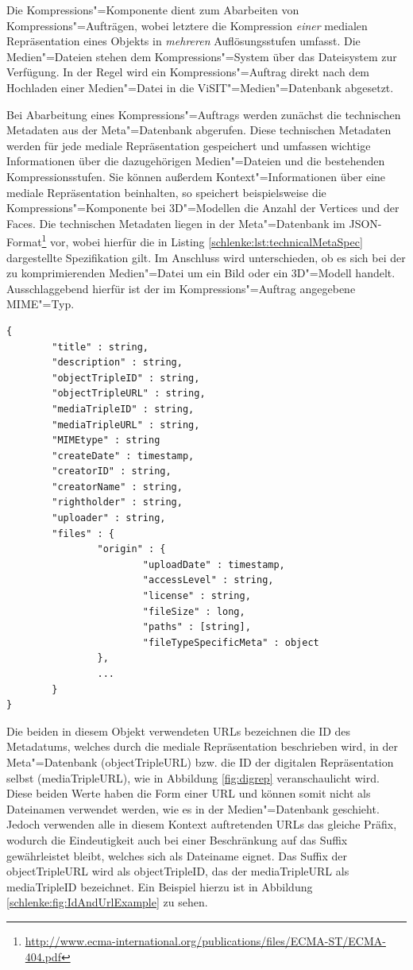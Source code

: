 Die Kompressions"=Komponente dient zum Abarbeiten von Kompressions"=Aufträgen, wobei letztere die Kompression \emph{einer} medialen Repräsentation eines Objekts in \emph{mehreren} Auflösungsstufen umfasst. Die Medien"=Dateien stehen dem Kompressions"=System über das Dateisystem zur Verfügung. In der Regel wird ein Kompressions"=Auftrag direkt nach dem Hochladen einer Medien"=Datei in die ViSIT"=Medien"=Datenbank abgesetzt.

Bei Abarbeitung eines Kompressions"=Auftrags werden zunächst die technischen Metadaten aus der Meta"=Datenbank abgerufen. Diese technischen Metadaten werden für jede mediale Repräsentation gespeichert und umfassen wichtige Informationen über die dazugehörigen Medien"=Dateien und die bestehenden Kompressionsstufen. Sie können außerdem Kontext"=Informationen über eine mediale Repräsentation beinhalten, so speichert beispielsweise die Kompressions"=Komponente bei 3D"=Modellen die Anzahl der Vertices und der Faces. Die technischen Metadaten liegen in der Meta"=Datenbank im JSON-Format\footnote{\url{http://www.ecma-international.org/publications/files/ECMA-ST/ECMA-404.pdf}} vor, wobei hierfür die in Listing \ref{schlenke:lst:technicalMetaSpec} dargestellte Spezifikation gilt. Im Anschluss wird unterschieden, ob es sich bei der zu komprimierenden Medien"=Datei um ein Bild oder ein 3D"=Modell handelt. Ausschlaggebend hierfür ist der im Kompressions"=Auftrag angegebene MIME"=Typ.

\begin{lstlisting}[float, caption={Spezifikation des die technischen Metadaten beinhaltenden JSON-Objekts},label=schlenke:lst:technicalMetaSpec]
{
		"title"	: string,
		"description" : string,
		"objectTripleID" : string,
		"objectTripleURL" : string,
		"mediaTripleID" : string,
		"mediaTripleURL" : string,
		"MIMEtype" : string
		"createDate" : timestamp,
		"creatorID" : string,
		"creatorName" : string,
		"rightholder" : string,
		"uploader" : string, 
		"files" : {
				"origin" : {
						"uploadDate" : timestamp,
						"accessLevel" : string,
						"license" : string,
						"fileSize" : long,
						"paths" : [string],
						"fileTypeSpecificMeta" : object
				},
				...
		}
}
\end{lstlisting}

Die beiden in diesem Objekt verwendeten URLs bezeichnen die ID des Metadatums, welches durch die mediale Repräsentation beschrieben wird, in der Meta"=Datenbank ({\ttfamily object\-Triple\-URL}) bzw. die ID der digitalen Repräsentation selbst ({\ttfamily media\-Triple\-URL}), wie in Abbildung \autoref{fig:digrep} veranschaulicht wird. Diese beiden Werte haben die Form einer URL und können somit nicht als Dateinamen verwendet werden, wie es in der Medien"=Datenbank geschieht. Jedoch verwenden alle in diesem Kontext auftretenden URLs das gleiche Präfix, wodurch die Eindeutigkeit auch bei einer Beschränkung auf das Suffix gewährleistet bleibt, welches sich als Dateiname eignet. Das Suffix der {\ttfamily object\-Triple\-URL} wird als {\ttfamily object\-Triple\-ID}, das der {\ttfamily media\-Triple\-URL} als {\ttfamily media\-Triple\-ID} bezeichnet. Ein Beispiel hierzu ist in Abbildung \ref{schlenke:fig:IdAndUrlExample} zu sehen.

